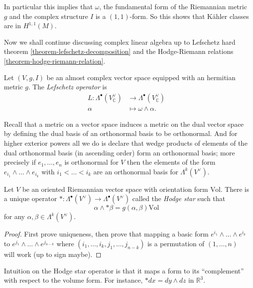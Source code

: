 \documentclass{book}
\begin{document}
\noindent
In particular this implies that $\omega$,
the fundamental form of the Riemannian metric
$g$
and the complex structure $I$ is a
$(1,1)$-form.
So this shows that Kähler classes are in
$H^{1,1}(M)$.






\noindent
Now we shall continue discussing complex
linear algebra up
to Lefschetz hard theorem
\ref{theorem-lefschetz-decomposition}
and the Hodge-Riemann relations
\ref{theorem-hodge-riemann-relation}.


\begin{definition}
\label{definition-lefschetz-operator}
Let $(V,g,I)$ be an almost complex vector
space
equipped with an hermitian metric $g$.
The {\it Lefschetz operator} is
$$
\begin{aligned}
L: \Lambda^\bullet(V_{\mathbb{C}}^\vee)
&\longrightarrow
\Lambda^\bullet(V_{\mathbb{C}}^\vee) \\
\alpha &\longmapsto \omega\wedge\alpha.
\end{aligned}
$$
\end{definition}

\noindent
Recall that a metric on a vector space
induces a metric on the dual vector space
by defining the dual basis of an orthonormal
basis
to be orthonormal.
And for higher exterior powers all we do is
declare that wedge products of elements of
the dual orthonormal basis
(in ascending order)
form an orthonormal basis; more precisely
if $e_1,…,e_n$ is orthonormal for $V$ then
the elements of the form
$e_{i_1}\wedge…\wedge e_{i_k}$ with
$i_1<…<i_k$
are an orthonormal basis for
$\Lambda^k(V^\vee)$.

\begin{exercise}
\label{exercise-hodge-star-existence}
Let $V$ be an oriented Riemannian vector
space with
orientation form $\text{Vol}$.
There is a unique operator
$*:\Lambda^\bullet(V^\vee) \to
\Lambda^\bullet(V^\vee)$
called the {\it Hodge star} such that
$$
\alpha\wedge*\beta=g(\alpha,\beta)\text{Vol}
$$
for any $\alpha,\beta \in \Lambda^k(V^\vee)$.
\end{exercise}

\begin{proof}
First prove uniqueness,
then prove that mapping a basic form
$e^{i_1}\wedge… \wedge e^{i_k}$
to $e^{j_1}\wedge…\wedge e^{j_{n-k}}$
where $(i_1,…,i_k,j_1,…,j_{n-k})$ is a
permutation of
$(1,…,n)$ will work (up to sign maybe).
\end{proof}

\noindent
Intuition on the Hodge star operator is that
it maps a form to its ``complement'' with
respect to the volume form.
For instance, $*dx=dy \wedge dz$ in
$\mathbb{R}^3$.
\end{document}
